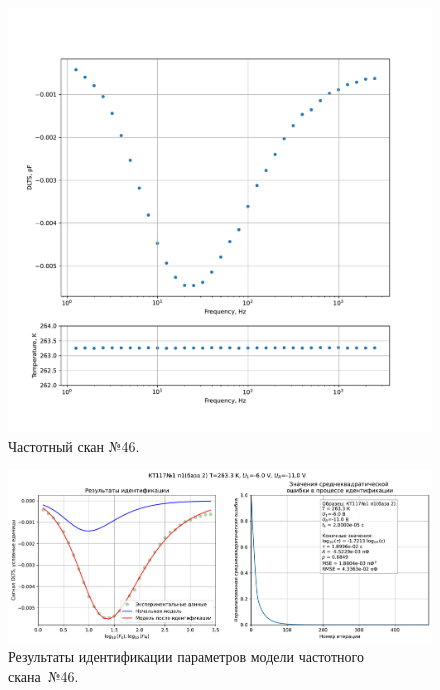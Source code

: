 \begin{figure}[!ht]
    \centering
    \includegraphics[width=1\textwidth]{../plots/КТ117№1_п1(база 2)_2500Гц-1Гц_1пФ_-10С_-6В-11В_100мВ_20мкс_шаг_0,1.pdf}
    \caption{Частотный скан №46.}
    \label{pic:frequency_scan_46}
\end{figure}

\begin{figure}[!ht]
    \centering
    \includegraphics[width=1\textwidth]{../plots/КТ117№1_п1(база 2)_2500Гц-1Гц_1пФ_-10С_-6В-11В_100мВ_20мкс_шаг_0,1_model.pdf}
    \caption{Результаты идентификации параметров модели частотного скана~№46.}
    \label{pic:frequency_scan_model46}
\end{figure}

\pagebreak


